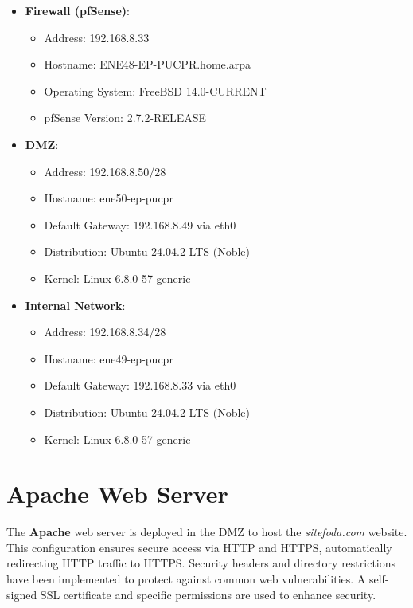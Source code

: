 \documentclass[12pt]{report}
\begin{document}
\begin{itemize}
    \item \textbf{Firewall (pfSense)}: 
    \begin{itemize}
        \item Address: 192.168.8.33
        \item Hostname: ENE48-EP-PUCPR.home.arpa
        \item Operating System: FreeBSD 14.0-CURRENT
        \item pfSense Version: 2.7.2-RELEASE
    \end{itemize}
    
    \item \textbf{DMZ}: 
    \begin{itemize}
        \item Address: 192.168.8.50/28
        \item Hostname: ene50-ep-pucpr
        \item Default Gateway: 192.168.8.49 via eth0
        \item Distribution: Ubuntu 24.04.2 LTS (Noble)
        \item Kernel: Linux 6.8.0-57-generic
    \end{itemize}
    
    \item \textbf{Internal Network}: 
    \begin{itemize}
        \item Address: 192.168.8.34/28
        \item Hostname: ene49-ep-pucpr
        \item Default Gateway: 192.168.8.33 via eth0
        \item Distribution: Ubuntu 24.04.2 LTS (Noble)
        \item Kernel: Linux 6.8.0-57-generic
    \end{itemize}
\end{itemize}

\newpage

\section*{Apache Web Server}

The \textbf{Apache} web server is deployed in the DMZ to host the \textit{sitefoda.com} website. This configuration ensures secure access via HTTP and HTTPS, automatically redirecting HTTP traffic to HTTPS. Security headers and directory restrictions have been implemented to protect against common web vulnerabilities. A self-signed SSL certificate and specific permissions are used to enhance security.
\end{document}
